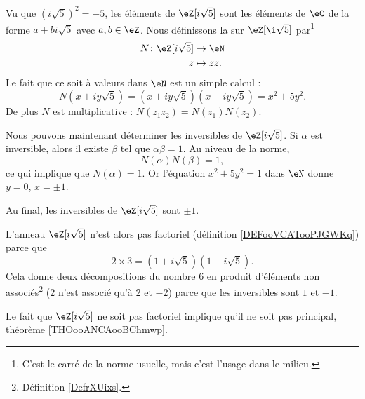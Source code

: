 \begin{example}     \label{EXooYCTDooGXAjGC}
    Vu que \( (i\sqrt{ 5 })^2=-5\), les éléments de \( \eZ[i\sqrt{ 5 }]\) sont les éléments de \( \eC\) de la forme \( a+bi\sqrt{ 5 }\) avec \( a,b\in \eZ\). Nous définissons la  sur \( \eZ[\i\sqrt{ 5 }]\) par\footnote{C'est le carré de la norme usuelle, mais c'est l'usage dans le milieu.}
    \begin{equation}
        \begin{aligned}
            N\colon \eZ[i\sqrt{ 5 }]&\to \eN \\
            z&\mapsto z\bar z. 
        \end{aligned}
    \end{equation}
    Le fait que ce soit à valeurs dans \( \eN\) est un simple calcul :
    \begin{equation}
        N(x+iy\sqrt{ 5 })=(x+iy\sqrt{ 5 })(x-iy\sqrt{ 5 })=x^2+5y^2.
    \end{equation}
    De plus \( N\) est multiplicative : \( N(z_1z_2)=N(z_1)N(z_2)\).

    Nous pouvons maintenant déterminer les inversibles de \( \eZ[i\sqrt{ 5 }]\). Si \( \alpha\) est inversible, alors il existe \( \beta\) tel que \( \alpha\beta=1\). Au niveau de la norme, 
    \begin{equation}
        N(\alpha)N(\beta)=1,
    \end{equation}
    ce qui implique que \( N(\alpha)=1\). Or l'équation \( x^2+5y^2=1\) dans \( \eN\) donne \( y=0\), \( x=\pm 1\).

    Au final, les inversibles de \( \eZ[i\sqrt{ 5 }]\) sont \( \pm 1\).

    L'anneau \( \eZ[i\sqrt{ 5 }]\) n'est alors pas factoriel (définition \ref{DEFooVCATooPJGWKq}) parce que 
    \begin{equation}
        2\times 3=(1+i\sqrt{ 5 })(1-i\sqrt{ 5 }).
    \end{equation}
    Cela donne deux décompositions du nombre \( 6\) en produit d'éléments non associés\footnote{Définition \ref{DefrXUixs}.} (\( 2\) n'est associé qu'à \( 2\) et \( -2\)) parce que les inversibles sont \( 1\) et \( -1\).

    Le fait que \( \eZ[i\sqrt{ 5 }]\) ne soit pas factoriel implique qu'il ne soit pas principal, théorème \ref{THOooANCAooBChmwp}.
\end{example}

